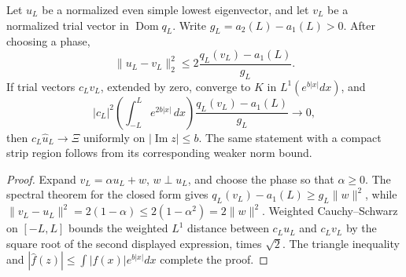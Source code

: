 \begin{proposition}
\label{AC-S07}
Let \(u_L\) be a normalized even simple lowest eigenvector, and let
\(v_L\) be a normalized trial vector in \(\operatorname{Dom}q_L\).
Write \(g_L=a_2(L)-a_1(L)>0\).  After choosing a phase,
\[
 \|u_L-v_L\|_2^2
 \leq 2\frac{q_L(v_L)-a_1(L)}{g_L}.
\]
If trial vectors \(c_Lv_L\), extended by zero, converge to \(K\)
in \(L^1(e^{b|x|}dx)\), and
\[
 |c_L|^2\left(\int_{-L}^Le^{2b|x|}\,dx\right)
       \frac{q_L(v_L)-a_1(L)}{g_L}\longrightarrow0,
\]
then \(c_L\widehat u_L\to\Xi\) uniformly on
\(|\operatorname{Im}z|\leq b\).  The same statement with a compact
strip region follows from its corresponding weaker norm bound.
\end{proposition}
\begin{proof}
Expand \(v_L=\alpha u_L+w\), \(w\perp u_L\), and choose the
phase so that \(\alpha\geq0\).  The spectral theorem for the closed
form gives
\(q_L(v_L)-a_1(L)\geq g_L\|w\|^2\), while
\(\|v_L-u_L\|^2=2(1-\alpha)\leq2(1-\alpha^2)=2\|w\|^2\).
Weighted Cauchy--Schwarz on \([-L,L]\) bounds the weighted \(L^1\)
distance between \(c_Lu_L\) and \(c_Lv_L\) by the square root of
the second displayed expression, times \(\sqrt2\).
The triangle inequality and
\(|\widehat f(z)|\leq\int|f(x)|e^{b|x|}dx\) complete the proof.
\end{proof}

